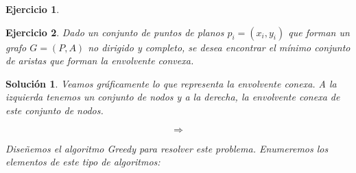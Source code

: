\documentclass[11pt, a4paper]{article}
\newif\IfInSansMode
\theoremstyle{theorem-style}
\theoremstyle{definition-style}
\newtheorem{ejer}{Ejercicio}[section]
\theoremstyle{remark-style}
\newtheorem*{sol}{Solución}
\theoremstyle{example-style}
\begin{document}
\begin{ejer}
  
\end{ejer}

\begin{ejer}
  Dado un conjunto de puntos de planos $p_i = (x_i,y_i)$ que forman un grafo $G =
  (P, A)$ no dirigido y completo, se desea encontrar el mínimo conjunto de aristas
  que forman la \textit{envolvente convexa}.  
\end{ejer}

\begin{sol}\hfill

  Veamos gráficamente lo que representa la \textit{envolvente conexa}. A la
  izquierda tenemos un conjunto de nodos y a la derecha, la envolvente conexa de
  este conjunto de nodos.

  \vspace{1em}

  \begin{minipage}[c]{0.45\textwidth}
  \end{minipage}\hfill
  \begin{minipage}[c]{0.1\textwidth}
    $$\Rightarrow$$
  \end{minipage}\hfill
  \begin{minipage}[c]{0.45\textwidth}\hfill
  \end{minipage}
  
  \vspace{1em}

  Diseñemos el algoritmo Greedy para resolver este problema. Enumeremos los
  elementos de este tipo de algoritmos:


\end{sol}
\end{document}
